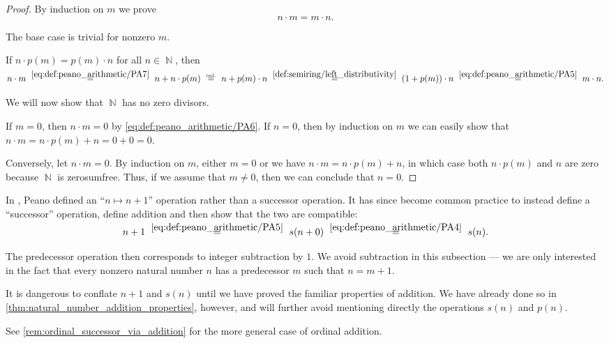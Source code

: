 \begin{proof}
   By induction on \( m \) we prove
  \begin{equation*}
    n \cdot m = m \cdot n.
  \end{equation*}

  The base case is trivial for nonzero \( m \).

  If \( n \cdot p(m) = p(m) \cdot n \) for all \( n \in \BbbN \), then
  \begin{equation*}
    n \cdot m
    \reloset{\eqref{eq:def:peano_arithmetic/PA7}} =
    n + n \cdot p(m)
    \reloset {\T{ind.}} =
    n + p(m) \cdot n
    \reloset{\eqref{def:semiring/left_distributivity}} =
    (1 + p(m)) \cdot n
    \reloset{\eqref{eq:def:peano_arithmetic/PA5}} =
    m \cdot n.
  \end{equation*}

   We will now show that \( \BbbN \) has no zero divisors.

  If \( m = 0 \), then \( n \cdot m = 0 \) by \eqref{eq:def:peano_arithmetic/PA6}. If \( n = 0 \), then by induction on \( m \) we can easily show that \( n \cdot m = n \cdot p(m) + n = 0 + 0 = 0 \).

  Conversely, let \( n \cdot m = 0 \). By induction on \( m \), either \( m = 0 \) or we have \( n \cdot m = n \cdot p(m) + n \), in which case both \( n \cdot p(m) \) and \( n \) are zero because \( \BbbN \) is zerosumfree. Thus, if we assume that \( m \neq 0 \), then we can conclude that \( n = 0 \).
\end{proof}

\begin{remark}\label{rem:natural_number_successor_via_addition}
  In \cite[1]{Peano1889ArithmeticesPrincipia}, Peano defined an \enquote{\( n \mapsto n + 1 \)} operation rather than a successor operation. It has since become common practice to instead define a \enquote{successor} operation, define addition and then show that the two are compatible:
  \begin{equation*}
    n + 1
    \reloset {\eqref{eq:def:peano_arithmetic/PA5}} =
    s(n + 0)
    \reloset {\eqref{eq:def:peano_arithmetic/PA4}} =
    s(n).
  \end{equation*}

  The predecessor operation then corresponds to integer subtraction by \( 1 \). We avoid subtraction in this subsection --- we are only interested in the fact that every nonzero natural number \( n \) has a predecessor \( m \) such that \( n = m + 1 \).

  It is dangerous to conflate \( n + 1 \) and \( s(n) \) until we have proved the familiar properties of addition. We have already done so in \cref{thm:natural_number_addition_properties}, however, and will further avoid mentioning directly the operations \( s(n) \) and \( p(n) \).

  See \cref{rem:ordinal_successor_via_addition} for the more general case of ordinal addition.
\end{remark}

